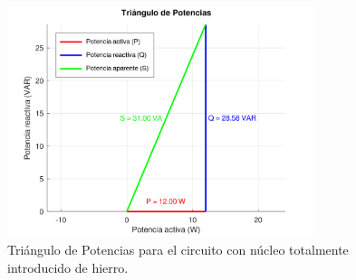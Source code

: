 \documentclass{article}
\begin{document}
                        \begin{figure}[H]
                            \centering
                            \includegraphics[width=0.8\textwidth]{graficoTotalHierro.png}
                            \caption{Triángulo de Potencias para el circuito con núcleo totalmente introducido de hierro.}
                            \label{fig:graficoTotalHierro}
                        \end{figure}




                    
\end{document}
